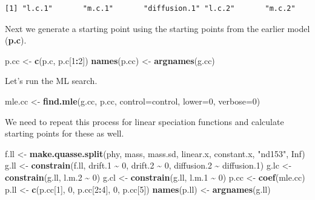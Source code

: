 \documentclass[
]{book}
\newenvironment{Shaded}{\begin{snugshade}}{\end{snugshade}}
\newcommand{\DataTypeTok}[1]{\textcolor[rgb]{0.13,0.29,0.53}{#1}}
\newcommand{\DecValTok}[1]{\textcolor[rgb]{0.00,0.00,0.81}{#1}}
\newcommand{\FloatTok}[1]{\textcolor[rgb]{0.00,0.00,0.81}{#1}}
\newcommand{\KeywordTok}[1]{\textcolor[rgb]{0.13,0.29,0.53}{\textbf{#1}}}
\newcommand{\NormalTok}[1]{#1}
\newcommand{\OperatorTok}[1]{\textcolor[rgb]{0.81,0.36,0.00}{\textbf{#1}}}
\newcommand{\OtherTok}[1]{\textcolor[rgb]{0.56,0.35,0.01}{#1}}
\newcommand{\StringTok}[1]{\textcolor[rgb]{0.31,0.60,0.02}{#1}}
\begin{document}
\begin{verbatim}
[1] "l.c.1"       "m.c.1"       "diffusion.1" "l.c.2"       "m.c.2"      
\end{verbatim}

Next we generate a starting point using the starting points from the earlier model (\textbf{p.c}).

\begin{Shaded}
\begin{Highlighting}[]
\NormalTok{p.cc \textless{}{-}}\StringTok{ }\KeywordTok{c}\NormalTok{(p.c, p.c[}\DecValTok{1}\OperatorTok{:}\DecValTok{2}\NormalTok{])}
\KeywordTok{names}\NormalTok{(p.cc) \textless{}{-}}\StringTok{ }\KeywordTok{argnames}\NormalTok{(g.cc)}
\end{Highlighting}
\end{Shaded}

Let's run the ML search.

\begin{Shaded}
\begin{Highlighting}[]
\NormalTok{mle.cc \textless{}{-}}\StringTok{ }\KeywordTok{find.mle}\NormalTok{(g.cc, p.cc, }\DataTypeTok{control=}\NormalTok{control, }\DataTypeTok{lower=}\DecValTok{0}\NormalTok{, }\DataTypeTok{verbose=}\DecValTok{0}\NormalTok{)}
\end{Highlighting}
\end{Shaded}

We need to repeat this process for linear speciation functions and calculate starting points for these as well.

\begin{Shaded}
\begin{Highlighting}[]
\NormalTok{f.ll \textless{}{-}}\StringTok{ }\KeywordTok{make.quasse.split}\NormalTok{(phy, mass, mass.sd, linear.x, constant.x, }\StringTok{"nd153"}\NormalTok{, }\OtherTok{Inf}\NormalTok{)}
\NormalTok{g.ll \textless{}{-}}\StringTok{ }\KeywordTok{constrain}\NormalTok{(f.ll, drift}\FloatTok{.1} \OperatorTok{\textasciitilde{}}\StringTok{ }\DecValTok{0}\NormalTok{, drift}\FloatTok{.2} \OperatorTok{\textasciitilde{}}\StringTok{ }\DecValTok{0}\NormalTok{, diffusion}\FloatTok{.2} \OperatorTok{\textasciitilde{}}\StringTok{ }\NormalTok{diffusion}\FloatTok{.1}\NormalTok{)}
\NormalTok{g.lc \textless{}{-}}\StringTok{ }\KeywordTok{constrain}\NormalTok{(g.ll, l.m}\FloatTok{.2} \OperatorTok{\textasciitilde{}}\StringTok{ }\DecValTok{0}\NormalTok{)}
\NormalTok{g.cl \textless{}{-}}\StringTok{ }\KeywordTok{constrain}\NormalTok{(g.ll, l.m}\FloatTok{.1} \OperatorTok{\textasciitilde{}}\StringTok{ }\DecValTok{0}\NormalTok{)}
\NormalTok{p.cc \textless{}{-}}\StringTok{ }\KeywordTok{coef}\NormalTok{(mle.cc)}
\NormalTok{p.ll \textless{}{-}}\StringTok{ }\KeywordTok{c}\NormalTok{(p.cc[}\DecValTok{1}\NormalTok{], }\DecValTok{0}\NormalTok{, p.cc[}\DecValTok{2}\OperatorTok{:}\DecValTok{4}\NormalTok{], }\DecValTok{0}\NormalTok{, p.cc[}\DecValTok{5}\NormalTok{])}
\KeywordTok{names}\NormalTok{(p.ll) \textless{}{-}}\StringTok{ }\KeywordTok{argnames}\NormalTok{(g.ll)}
\end{Highlighting}
\end{Shaded}
\end{document}
